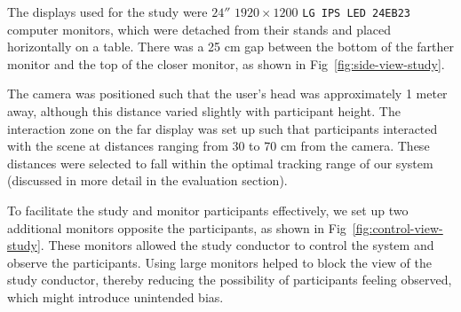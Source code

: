 The displays used for the study were $24''$ $1920 \times 1200$ \texttt{LG IPS LED 24EB23} computer monitors, which were detached from their stands and placed horizontally on a table. There was a 25 cm gap between the bottom of the farther monitor and the top of the closer monitor, as shown in Fig~\ref{fig:side-view-study}.

The camera was positioned such that the user’s head was approximately 1 meter away, although this distance varied slightly with participant height. The interaction zone on the far display was set up such that participants interacted with the scene at distances ranging from 30 to 70 cm from the camera. These distances were selected to fall within the optimal tracking range of our system (discussed in more detail in the evaluation section).

To facilitate the study and monitor participants effectively, we set up two additional monitors opposite the participants, as shown in Fig~\ref{fig:control-view-study}. These monitors allowed the study conductor to control the system and observe the participants. Using large monitors helped to block the view of the study conductor, thereby reducing the possibility of participants feeling observed, which might introduce unintended bias.

